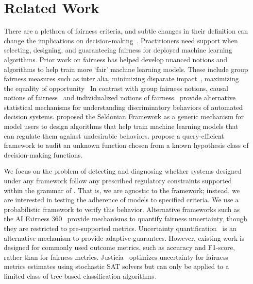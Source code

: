 \section{Related Work}
\label{sec:related}

There are a plethora of fairness criteria, and subtle changes in their definition can change the implications on decision-making~\cite{castelnovo2021zoo}.
Practitioners need support when selecting, designing, and guaranteeing fairness for deployed machine learning algorithms.
Prior work on fairness has helped develop nuanced notions and algorithms to help train more `fair' machine learning models.
These include group fairness measures such as inter alia, minimizing disparate impact~\citep{calders2009building,feldman2015certifying}, maximizing the equality of opportunity~\citep{hardt2016equality}
In contrast with group fairness notions, causal notions of fairness~\cite{kusner2017counterfactual} and individualized notions of fairness~\cite{dwork2012fairness} provide alternative statistical mechanisms for understanding discriminatory behaviors of automated decision systems.
\citet{thomas2019preventing} proposed the Seldonian Framework as a generic mechanism for model users to design algorithms that help train machine learning models that can regulate them against undesirable behaviors.
\citet{yan2022active} propose a query-efficient framework to audit an unknown function chosen from a known hypothesis class of decision-making functions.

We focus on the problem of detecting and diagnosing whether systems designed under any framework follow any prescribed regulatory constraints supported within the grammar of \AVOIRmethodname{}.
That is, we are agnostic to the framework; instead, we are interested in testing the adherence of models to specified criteria.
We use a probabilistic framework to verify this behavior.
Alternative frameworks such as the AI Fairness 360~\citep{bellamy2019AI}  provide mechanisms to quantify fairness uncertainty, though they are restricted to pre-supported metrics.
Uncertainty quantification~\citep{ghosh2021uncertainty,ginart2022mldemon} is an alternative mechanism to provide adaptive guarantees. 
However, existing work is designed for commonly used outcome metrics, such as accuracy and F1-score, rather than for fairness metrics. 
Justicia~\citep{ghosh2021justicia} optimizes uncertainty for fairness metrics estimates using stochastic SAT solvers but can only be applied to a limited class of tree-based classification algorithms.

